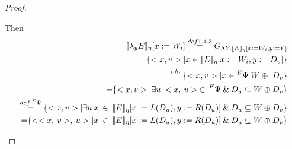 \documentclass{article}
\begin{document}
\begin{proof}
\begin{enumerate}
\begin{itemize}
\begin{equation*}
				\end{equation*}
				Then
				\begin{equation*}
				\begin{split}
					\llbracket \lambda_y E \rrbracket_\eta{ [x := W_i]}
					\stackrel{def 1.4.3}{=}
					G_{\Lambda Y. \llbracket E \rrbracket_\eta
					{[x := W_i, y:= Y]}}
					\\{=}
					\{<x, v> | x \in 
					\llbracket E \rrbracket_\eta {[x := W_i, y:= D_v]}\}
					\\\stackrel{i.h.}{=}
					\{<x, v> | x \in 
					\prescript{E}{}{\Psi}{}{} \: W \oplus\ D_v\}
					\\{=}
					\{<x, v> | \exists u \:	<x,\:u>\:\in\:
					\prescript{E}{}{\Psi}{}{}\:\&\: 
					D_u \subseteq W \oplus D_v\}
					\\\stackrel{def \prescript{E}{}{\Psi}{}{}}{=}
					\{<x, v> | \exists u \: 	x\:\in\:
					\llbracket E \rrbracket_\eta
					{[x := L(D_u), y:= R(D_u)]}
					\:\&\: 	D_u \subseteq W \oplus D_v\}	
					\\{=}
					\{<<x,\:v>,\:u> | x \:\in\:
					\llbracket E \rrbracket_\eta
					{[x := L(D_u), y:= R(D_u)]}
					\:\&\: 	D_u \subseteq W \oplus D_v\}
				\end{split}
				\end{equation*}
				\end{itemize}
		\end{enumerate}
	\end{proof}
	
\end{document}
